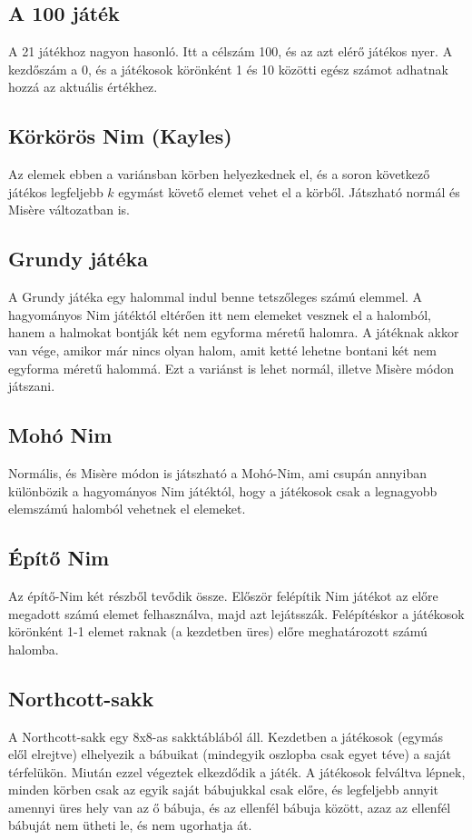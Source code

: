 \subsection{A 100 játék}
A 21 játékhoz nagyon hasonló. Itt a célszám 100, és az azt elérő játékos nyer. A kezdőszám a 0, és a játékosok körönként 1 és 10 közötti egész számot adhatnak hozzá az aktuális értékhez.

\subsection{Körkörös Nim (Kayles)}
Az elemek ebben a variánsban körben helyezkednek el, és a soron következő játékos legfeljebb $k$ egymást követő elemet vehet el a körből. Játszható normál és Misère változatban is.

\subsection{Grundy játéka}
A Grundy játéka egy halommal indul benne tetszőleges számú elemmel. A hagyományos Nim játéktól eltérően itt nem elemeket vesznek el a halomból, hanem a halmokat bontják két nem egyforma méretű halomra. A játéknak akkor van vége, amikor már nincs olyan halom, amit ketté lehetne bontani két nem egyforma méretű halommá. Ezt a variánst is lehet normál, illetve Misère módon játszani.

\subsection{Mohó Nim}
Normális, és Misère módon is játszható a Mohó-Nim, ami csupán annyiban különbözik a hagyományos Nim játéktól, hogy a játékosok csak a legnagyobb elemszámú halomból vehetnek el elemeket.

\subsection{Építő Nim}
Az építő-Nim két részből tevődik össze. Először felépítik Nim játékot az előre megadott számú elemet felhasználva, majd azt lejátsszák. Felépítéskor a játékosok körönként 1-1 elemet raknak (a kezdetben üres) előre meghatározott számú halomba.

\subsection{Northcott-sakk}
A Northcott-sakk egy 8x8-as sakktáblából áll. Kezdetben a játékosok (egymás elől elrejtve) elhelyezik a bábuikat (mindegyik oszlopba csak egyet téve) a saját térfelükön. Miután ezzel végeztek elkezdődik a játék. A játékosok felváltva lépnek, minden körben csak az egyik saját bábujukkal csak előre, és legfeljebb annyit amennyi üres hely van az ő bábuja, és az ellenfél bábuja között, azaz az ellenfél bábuját nem ütheti le, és nem ugorhatja át.\\

